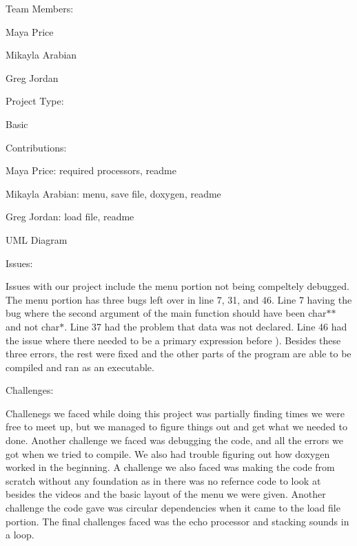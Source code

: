 Team Members\+:
\begin{DoxyItemize}
\item Maya Price
\item Mikayla Arabian
\item Greg Jordan
\end{DoxyItemize}

Project Type\+:
\begin{DoxyItemize}
\item Basic
\end{DoxyItemize}

Contributions\+:
\begin{DoxyItemize}
\item Maya Price\+: required processors, readme
\item Mikayla Arabian\+: menu, save file, doxygen, readme
\item Greg Jordan\+: load file, readme
\end{DoxyItemize}

U\+ML Diagram
\begin{DoxyItemize}
\item 
\end{DoxyItemize}

Issues\+:
\begin{DoxyItemize}
\item Issues with our project include the menu portion not being compeltely debugged. The menu portion has three bugs left over in line 7, 31, and 46. Line 7 having the bug where the second argument of the main function should have been char$\ast$$\ast$ and not char$\ast$. Line 37 had the problem that data was not declared. Line 46 had the issue where there needed to be a primary expression before \textquotesingle{})\textquotesingle{}. Besides these three errors, the rest were fixed and the other parts of the program are able to be compiled and ran as an executable.
\end{DoxyItemize}

Challenges\+:
\begin{DoxyItemize}
\item Challenegs we faced while doing this project was partially finding times we were free to meet up, but we managed to figure things out and get what we needed to done. Another challenge we faced was debugging the code, and all the errors we got when we tried to compile. We also had trouble figuring out how doxygen worked in the beginning. A challenge we also faced was making the code from scratch without any foundation as in there was no refernce code to look at besides the videos and the basic layout of the menu we were given. Another challenge the code gave was circular dependencies when it came to the load file portion. The final challenges faced was the echo processor and stacking sounds in a loop.
\end{DoxyItemize}

